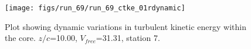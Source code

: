 \begin{figure}[H]
\centering
\texttt{[image: figs/run\_69/run\_69\_ctke\_01rdynamic]}
\caption{Plot showing dynamic variations in turbulent kinetic energy within the core. $z/c$=10.00, $V_{free}$=31.31, station 7.}
\label{fig:run_69_ctke_01rdynamic}
\end{figure}


